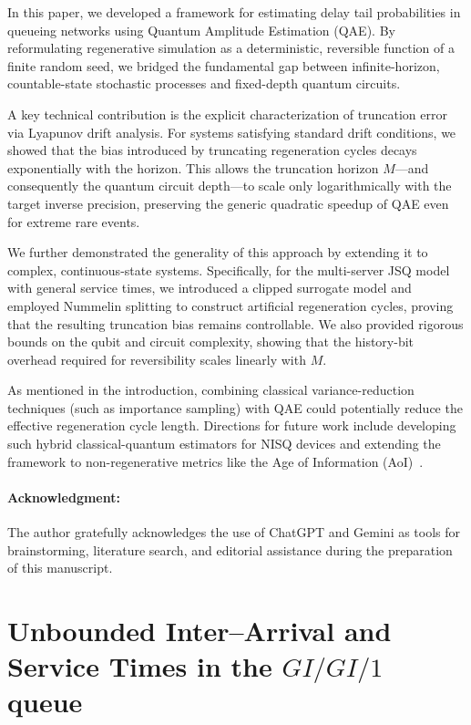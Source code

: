 \documentclass[11pt]{article}
\begin{document}
In this paper, we developed a framework for estimating delay tail probabilities in queueing networks using Quantum Amplitude Estimation (QAE). By reformulating regenerative simulation as a deterministic, reversible function of a finite random seed, we bridged the fundamental gap between infinite-horizon, countable-state stochastic processes and fixed-depth quantum circuits.

A key technical contribution is the explicit characterization of truncation error via Lyapunov drift analysis. For systems satisfying standard drift conditions, we showed that the bias introduced by truncating regeneration cycles decays exponentially with the horizon. This allows the truncation horizon $M$—and consequently the quantum circuit depth—to scale only logarithmically with the target inverse precision, preserving the generic quadratic speedup of QAE even for extreme rare events.

We further demonstrated the generality of this approach by extending it to complex, continuous-state systems. Specifically, for the multi-server JSQ model with general service times, we introduced a clipped surrogate model and employed Nummelin splitting to construct artificial regeneration cycles, proving that the resulting truncation bias remains controllable. We also provided rigorous bounds on the qubit and circuit complexity, showing that the history-bit overhead required for reversibility scales linearly with $M$.

As mentioned in the introduction, combining classical variance-reduction techniques (such as importance sampling) with QAE could potentially reduce the effective regeneration cycle length. Directions for future work include developing such hybrid classical-quantum estimators for NISQ devices and extending the framework to non-regenerative metrics like the Age of Information (AoI)~\cite{yates2021age,bedewy2023sampling}.

\paragraph{Acknowledgment:} The author gratefully acknowledges the use of ChatGPT and Gemini as tools for brainstorming, literature search, and editorial assistance during the preparation of this manuscript.

\newpage



\newpage
\appendix
\section{Unbounded Inter--Arrival and Service Times in the $GI/GI/1$ queue}
\label{app:unbounded}
\end{document}
